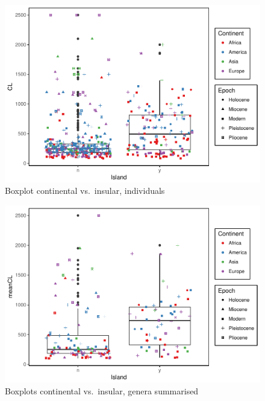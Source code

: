 \documentclass[]{article}
\begin{document}
\begin{figure}[htbp]
\centering
\includegraphics{MA_JJ_files/figure-latex/Boxplot continental vs. insular, individuals-1.pdf}
\caption{Boxplot continental vs.~insular, individuals}
\end{figure}

\begin{figure}[htbp]
\centering
\includegraphics{MA_JJ_files/figure-latex/Boxplots, genera summarised-1.pdf}
\caption{Boxplots continental vs.~insular, genera summarised}
\end{figure}
\end{document}
